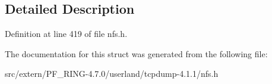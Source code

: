 \subsection{Detailed Description}


Definition at line 419 of file nfs.h.



The documentation for this struct was generated from the following file:\begin{DoxyCompactItemize}
\item 
src/extern/PF\_\-RING-\/4.7.0/userland/tcpdump-\/4.1.1/nfs.h\end{DoxyCompactItemize}
